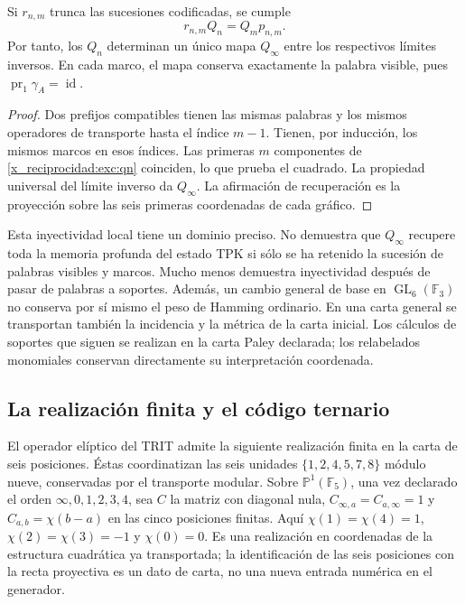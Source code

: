 \begin{proposition}
\label{x_reciprocidad:exc:limite-inverso}
Si $r_{n,m}$ trunca las sucesiones codificadas, se cumple
\[
 r_{n,m}Q_n=Q_m p_{n,m}.
\]
Por tanto, los $Q_n$ determinan un único mapa $Q_\infty$ entre los
respectivos límites inversos. En cada marco, el mapa conserva exactamente
la palabra visible, pues $\operatorname{pr}_1\gamma_A=\operatorname{id}$.
\end{proposition}

\begin{proof}
Dos prefijos compatibles tienen las mismas palabras y los mismos
operadores de transporte hasta el índice $m-1$. Tienen, por inducción,
los mismos marcos en esos índices. Las primeras $m$ componentes de
\eqref{x_reciprocidad:exc:qn} coinciden, lo que prueba el cuadrado. La propiedad
universal del límite inverso da $Q_\infty$. La afirmación de recuperación
es la proyección sobre las seis primeras coordenadas de cada gráfico.
\end{proof}

Esta inyectividad local tiene un dominio preciso. No demuestra que
$Q_\infty$ recupere toda la memoria profunda del estado TPK si sólo se
ha retenido la sucesión de palabras visibles y marcos. Mucho menos
demuestra inyectividad después de pasar de palabras a soportes.
Además, un cambio general de base en $\operatorname{GL}_6(\mathbb F_3)$
no conserva por sí mismo el peso de Hamming ordinario. En una carta
general se transportan también la incidencia y la métrica de la carta
inicial. Los cálculos de soportes que siguen se realizan en la carta
Paley declarada; los relabelados monomiales conservan directamente su
interpretación coordenada.

\subsection{La realización finita y el código ternario}
\label{x_reciprocidad:exc:paley-codigo}

El operador elíptico del TRIT admite la siguiente realización finita en
la carta de seis posiciones. Éstas coordinatizan las seis unidades
$\{1,2,4,5,7,8\}$ módulo nueve, conservadas por el transporte modular.
Sobre $\mathbb P^1(\mathbb F_5)$, una vez
declarado el orden $\infty,0,1,2,3,4$, sea $C$ la matriz con diagonal
nula, $C_{\infty,a}=C_{a,\infty}=1$ y
$C_{a,b}=\chi(b-a)$ en las cinco posiciones finitas. Aquí
$\chi(1)=\chi(4)=1$, $\chi(2)=\chi(3)=-1$ y $\chi(0)=0$.
Es una realización en coordenadas de la estructura cuadrática ya
transportada; la identificación de las seis posiciones con la recta
proyectiva es un dato de carta, no una nueva entrada numérica en el
generador.

